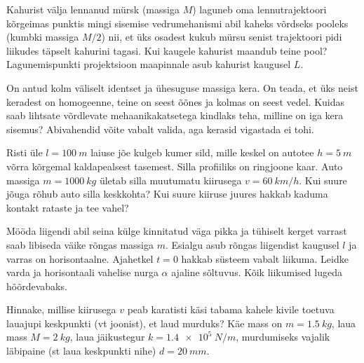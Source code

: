 \documentclass[10pt]{article}
\begin{document}
{%

Kahurist välja lennanud mürsk (massiga $M$) laguneb oma lennutrajektoori kõrgeimas punktis mingi sisemise vedrumehanismi abil kaheks võrdseks pooleks (kumbki massiga $M/2$) nii, et üks osadest kukub mürsu senist trajektoori pidi liikudes täpselt kahurini tagasi. Kui kaugele kahurist maandub teine pool? Lagunemispunkti projektsioon maapinnale asub kahurist kaugusel $L$.
\probend
\bigskip


On antud kolm väliselt identset ja ühesuguse massiga kera. On teada, et üks
neist keradest on homogeenne, teine on seest õõnes ja kolmas on seest vedel.
Kuidas saab lihtsate võrdlevate mehaanikakatsetega kindlaks teha, milline on iga
kera sisemus? Abivahendid võite vabalt valida, aga kerasid vigastada ei tohi.
\probend
\bigskip


Risti üle $l=\SI{100}{m}$ laiuse jõe kulgeb kumer sild, mille keskel on
autotee $h=\SI{5}{m}$ võrra kõrgemal kaldapealsest tasemest. Silla profiiliks on
ringjoone kaar. Auto massiga $m=\SI{1000}{kg}$ ületab silla muutumatu kiirusega $v=\SI{60}{km/h}$.
Kui suure jõuga rõhub auto silla keskkohta? Kui suure kiiruse juures hakkab kaduma
kontakt rataste ja tee vahel?
\probend
\bigskip


Mööda liigendi abil seina külge kinnitatud väga pikka ja tühiselt
kerget varrast saab libiseda väike rõngas massiga $m$. Esialgu asub rõngas liigendist kaugusel $l$ ja varras on horisontaalne. Ajahetkel $t = \num{0}$ hakkab süsteem
vabalt liikuma. Leidke varda ja horisontaali vahelise nurga $\alpha$ ajaline sõltuvus.
Kõik liikumised lugeda hõõrdevabaks.
\probend
\bigskip


Hinnake, millise kiirusega $v$ peab karatisti käsi tabama kahele kivile toetuva lauajupi keskpunkti (vt joonist), et laud murduks? Käe mass on $m = \SI{1,5}{kg}$, laua mass $M = \SI{2}{kg}$, laua jäikustegur $k = \SI{1,4e5}{N/m}$, murdumiseks vajalik läbipaine (st laua keskpunkti nihe) $d = \SI{20}{mm}$. 

}
\end{document}

